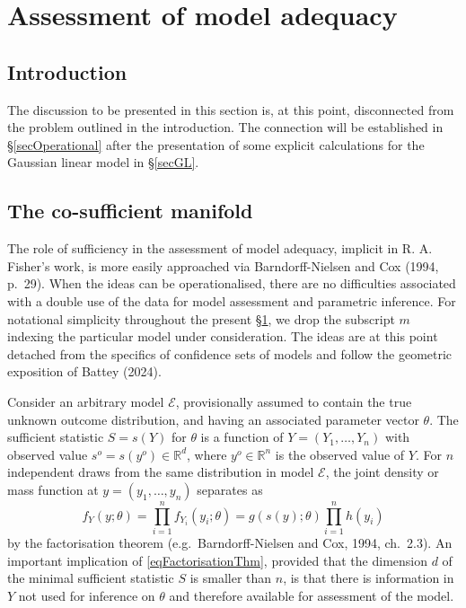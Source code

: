 \documentclass[10pt, reqno]{amsart}
\numberwithin{equation}{section}
\newcommand{\RR}{\mathbb{R}}
\begin{document}
\section{Assessment of model adequacy}\label{secModelSep}

\subsection{Introduction}\label{secPreambleSep}

The discussion to be presented in this section is, at this point, disconnected from the problem outlined in the introduction. The connection will be established in \S \ref{secOperational} after the presentation of some explicit calculations for the Gaussian linear model in \S \ref{secGL}.

\subsection{The co-sufficient manifold}\label{secCosuff}

The role of sufficiency in the assessment of model adequacy, implicit in R. A. Fisher's work, is more easily approached via Barndorff-Nielsen and Cox (1994, p.~29). When the ideas can be operationalised, there are no difficulties associated with a double use of the data for model assessment and parametric inference. For notational simplicity throughout the present \S \ref{secModelSep}, we drop the subscript $m$ indexing the particular model under consideration. The ideas are at this point detached from the specifics of confidence sets of models and follow the geometric exposition of Battey (2024). 

Consider an arbitrary model $\mathcal{E}$, provisionally assumed to contain the true unknown outcome distribution, and having an associated parameter vector $\theta$. The sufficient statistic $S=s(Y)$ for $\theta$ is a function of $Y=(Y_1,\ldots,Y_n)$ with observed value $s^o=s(y^o)\in \RR^d$, where $y^o\in\RR^n$ is the observed value of $Y$. For $n$ independent draws from the same distribution in model $\mathcal{E}$, the joint density or mass function at $y=(y_1,\ldots,y_n)$ separates as
%
\begin{equation}\label{eqFactorisationThm}
	f_Y(y;\theta)=\prod_{i=1}^n f_{Y_i}(y_i;\theta) = g(s(y);\theta)\prod_{i=1}^n h(y_i)
\end{equation}
%
by the factorisation theorem (e.g.~Barndorff-Nielsen and Cox, 1994, ch.~2.3). An important implication of \eqref{eqFactorisationThm}, provided that the dimension $d$ of the minimal sufficient statistic $S$ is smaller than $n$, is that there is information in $Y$ not used for inference on $\theta$ and therefore available for assessment of the model.
\end{document}
